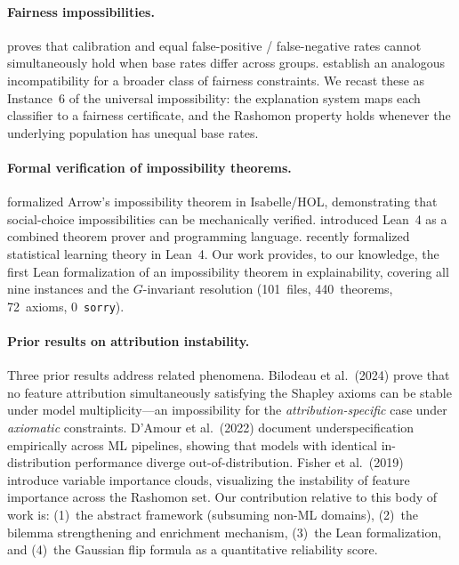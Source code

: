 \paragraph{Fairness impossibilities.}
\citet{chouldechova2017fair} proves that calibration and equal false-positive /
false-negative rates cannot simultaneously hold when base rates differ across
groups.  \citet{kleinberg2017inherent} establish an analogous incompatibility
for a broader class of fairness constraints.  We recast these as Instance~6 of
the universal impossibility: the explanation system maps each classifier to a
fairness certificate, and the Rashomon property holds whenever the underlying
population has unequal base rates.

\paragraph{Formal verification of impossibility theorems.}
\citet{nipkow2009social} formalized Arrow's impossibility theorem in
Isabelle/HOL, demonstrating that social-choice impossibilities can be
mechanically verified.  \citet{demoura2021lean4} introduced Lean~4 as a
combined theorem prover and programming language.
\citet{zhang2026statistical} recently formalized statistical learning theory in
Lean~4.  Our work provides, to our knowledge, the first Lean formalization of
an impossibility theorem in explainability, covering all nine instances and the
$G$-invariant resolution (101~files, 440~theorems, 72~axioms, 0~\texttt{sorry}).

\paragraph{Prior results on attribution instability.}
Three prior results address related phenomena.  Bilodeau et al.\ (2024) prove that no feature attribution simultaneously satisfying the Shapley axioms can be stable under model multiplicity---an impossibility for the \emph{attribution-specific} case under \emph{axiomatic} constraints.  D'Amour et al.\ (2022) document underspecification empirically across ML pipelines, showing that models with identical in-distribution performance diverge out-of-distribution.  Fisher et al.\ (2019) introduce variable importance clouds, visualizing the instability of feature importance across the Rashomon set.  Our contribution relative to this body of work is: (1)~the abstract framework (subsuming non-ML domains), (2)~the bilemma strengthening and enrichment mechanism, (3)~the Lean formalization, and (4)~the Gaussian flip formula as a quantitative reliability score.

